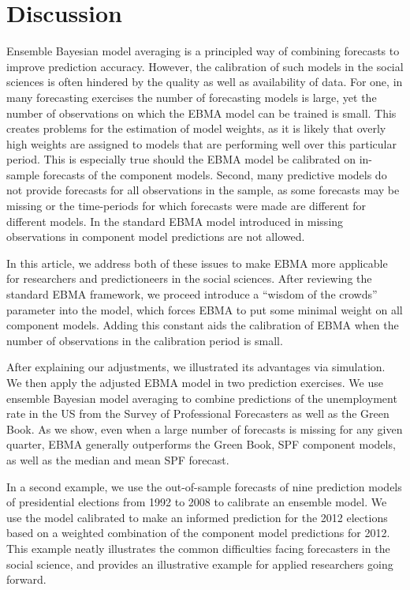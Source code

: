 \documentclass[12pt,fullpage,endnotes]{article}
\begin{document}
\section{Discussion} 
Ensemble Bayesian model averaging is a principled way of combining
forecasts to improve prediction accuracy. However, the calibration of
such models in the social sciences is often hindered by the quality as
well as availability of data. For one, in many forecasting exercises
the number of forecasting models is large, yet the number of
observations on which the EBMA model can be trained is small. This
creates problems for the estimation of model weights, as it is likely
that overly high weights are assigned to models that are performing
well over this particular period. This is especially true should the
EBMA model be calibrated on in-sample forecasts of the component
models. Second, many predictive models do not provide forecasts for
all observations in the sample, as some forecasts may be missing or
the time-periods for which forecasts were made are different for
different models. In the standard EBMA model introduced in
\citet{mhw:2012} missing observations in component model predictions
are not allowed.

In this article, we address both of these issues to make EBMA more
applicable for researchers and predictioneers in the social
sciences. After reviewing the standard EBMA framework, we proceed
introduce a ``wisdom of the crowds'' parameter into the model, which
forces EBMA to put some minimal weight on all component models. Adding
this constant aids the calibration of EBMA when the number of
observations in the calibration period is small.

After explaining our adjustments, we illustrated its advantages via
simulation.  We then apply the adjusted EBMA model in two prediction
exercises. We use ensemble Bayesian model averaging to combine
predictions of the unemployment rate in the US from the Survey of
Professional Forecasters as well as the Green Book. As we show, even
when a large number of forecasts is missing for any given quarter,
EBMA generally outperforms the Green Book, SPF component models, as
well as the median and mean SPF forecast.

In a second example, we use the out-of-sample forecasts of nine
prediction models of presidential elections from 1992 to 2008 to
calibrate an ensemble model. We use the model calibrated to make an
informed prediction for the 2012 elections based on a weighted
combination of the component model predictions for 2012. This example
neatly illustrates the common difficulties facing forecasters in the
social science, and provides an illustrative example for applied
researchers going forward.
\end{document}
